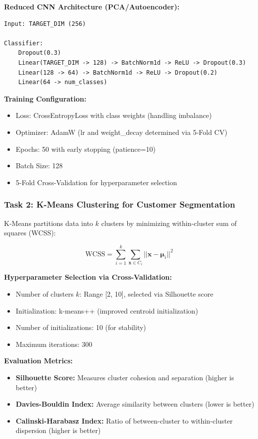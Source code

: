 \documentclass[11pt,a4paper]{article}
\begin{document}
\textbf{Reduced CNN Architecture (PCA/Autoencoder):}
\begin{verbatim}
Input: TARGET_DIM (256)

Classifier:
    Dropout(0.3)
    Linear(TARGET_DIM -> 128) -> BatchNorm1d -> ReLU -> Dropout(0.3)
    Linear(128 -> 64) -> BatchNorm1d -> ReLU -> Dropout(0.2)
    Linear(64 -> num_classes)
\end{verbatim}

\textbf{Training Configuration:}
\begin{itemize}
    \item Loss: CrossEntropyLoss with class weights (handling imbalance)
    \item Optimizer: AdamW (lr and weight\_decay determined via 5-Fold CV)
    \item Epochs: 50 with early stopping (patience=10)
    \item Batch Size: 128
    \item 5-Fold Cross-Validation for hyperparameter selection
\end{itemize}

\subsubsection{Task 2: K-Means Clustering for Customer Segmentation}

K-Means partitions data into $k$ clusters by minimizing within-cluster sum of squares (WCSS):

\begin{equation}
    \text{WCSS} = \sum_{i=1}^{k} \sum_{\mathbf{x} \in C_i} ||\mathbf{x} - \boldsymbol{\mu}_i||^2
\end{equation}

\textbf{Hyperparameter Selection via Cross-Validation:}
\begin{itemize}
    \item Number of clusters $k$: Range [2, 10], selected via Silhouette score
    \item Initialization: k-means++ (improved centroid initialization)
    \item Number of initializations: 10 (for stability)
    \item Maximum iterations: 300
\end{itemize}

\textbf{Evaluation Metrics:}
\begin{itemize}
    \item \textbf{Silhouette Score:} Measures cluster cohesion and separation (higher is better)
    \item \textbf{Davies-Bouldin Index:} Average similarity between clusters (lower is better)
    \item \textbf{Calinski-Harabasz Index:} Ratio of between-cluster to within-cluster dispersion (higher is better)
\end{itemize}
\end{document}
